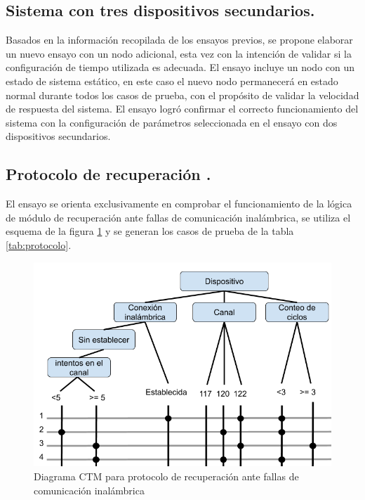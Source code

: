 \subsection{Sistema con tres dispositivos secundarios.}

Basados en la información recopilada de los ensayos previos, se propone elaborar un nuevo ensayo con un nodo adicional, esta vez con la intención de validar si la configuración de tiempo utilizada es adecuada. El ensayo incluye un nodo con un estado de sistema estático, en este caso el nuevo nodo permanecerá en estado normal durante todos los casos de prueba, con el propósito de validar la velocidad de respuesta del sistema. El ensayo logró confirmar el correcto funcionamiento del sistema con la configuración de parámetros seleccionada en el ensayo con dos dispositivos secundarios.

\subsection{Protocolo de recuperación .}

El ensayo se orienta exclusivamente en comprobar el funcionamiento de la lógica de módulo de recuperación ante fallas de comunicación inalámbrica, se utiliza el esquema de la figura \ref{fig:ctm_protocolo} y se generan los casos de prueba de la tabla \ref{tab:protocolo}.


\begin{figure}[ht]
	\centering
	\includegraphics[scale=.4]{./Figures/Capitulo4/CTM_PROTOCOLO.png}
	\caption{Diagrama CTM para protocolo de recuperación ante fallas de comunicación inalámbrica}
	\label{fig:ctm_protocolo}
\end{figure}


